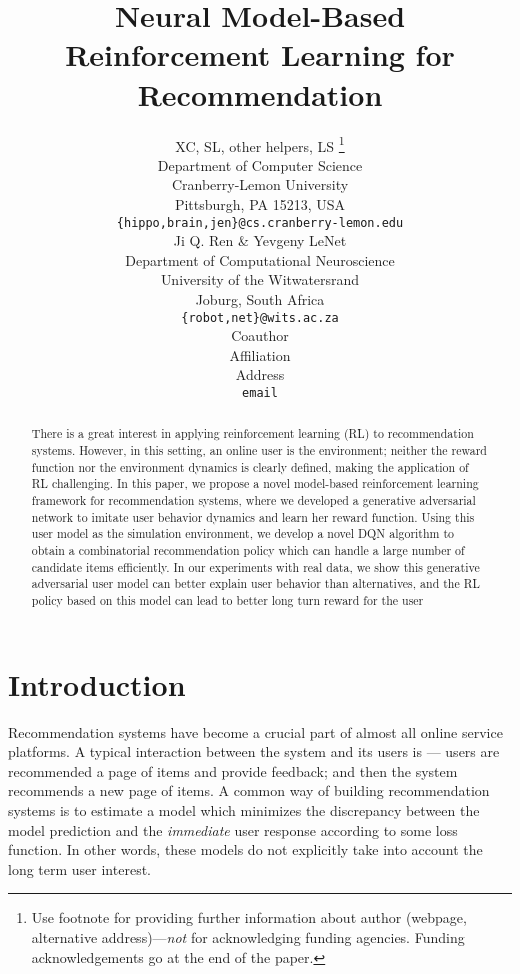 \documentclass{article} %
\title{Neural Model-Based Reinforcement Learning for Recommendation}
\author{
XC, SL, other helpers, LS
\thanks{ Use footnote for providing further information
about author (webpage, alternative address)---\emph{not} for acknowledging
funding agencies.  Funding acknowledgements go at the end of the paper.} \\
Department of Computer Science\\
Cranberry-Lemon University\\
Pittsburgh, PA 15213, USA \\
\texttt{\{hippo,brain,jen\}@cs.cranberry-lemon.edu} \\
\And
Ji Q. Ren \& Yevgeny LeNet \\
Department of Computational Neuroscience \\
University of the Witwatersrand \\
Joburg, South Africa \\
\texttt{\{robot,net\}@wits.ac.za} \\
\AND
Coauthor \\
Affiliation \\
Address \\
\texttt{email}
}
\newcommand{\xinshi}[1]{{\color{black}{#1}}}
\begin{document}
\maketitle

\begin{abstract}
 There is a great interest in applying reinforcement learning (RL) to recommendation systems. However, in this setting, an online user is the environment; neither the reward function nor the environment dynamics is clearly defined, making the application of RL challenging.
 In this paper, we propose a novel model-based reinforcement learning framework for recommendation systems, where we developed a generative adversarial network to imitate user behavior dynamics and learn her reward function. Using this user model as the simulation environment, we develop a novel DQN algorithm to obtain a combinatorial recommendation policy which can handle a large number of candidate items efficiently.
 In our experiments with real data, we show this generative adversarial user model can better explain user behavior than alternatives, and the RL policy based on this model can lead to better long turn reward for the user \xinshi{and higher click rate for the system.}
\end{abstract}
\vspace{-3mm}
\section{Introduction}
\vspace{-3mm}
        \setlength{\abovedisplayskip}{4pt}
        \setlength{\abovedisplayshortskip}{1pt}
        \setlength{\belowdisplayskip}{4pt}
        \setlength{\belowdisplayshortskip}{1pt}
        \setlength{\jot}{3pt}
        \setlength{\textfloatsep}{6pt}

Recommendation systems have become a crucial part of almost all online service platforms. A typical interaction between the
system and its users is --- users are recommended a page of items
and provide feedback; and then the system recommends a new
page of items. A common way of building recommendation systems is to estimate a model which minimizes the discrepancy between the model prediction and the \emph{immediate} user response according to some loss function. In other words, these models do not explicitly take into account the long term user interest. \xinshi{However, user's interest can evolve over time based on what she observes, and the recommender's action may significantly influence such evolution. In some sense the recommender is guiding users' interest by displaying particular items and hidding the rest. Thus, a recommendation strategy which takes user's long term interest into account is more favorable.
}
\end{document}
